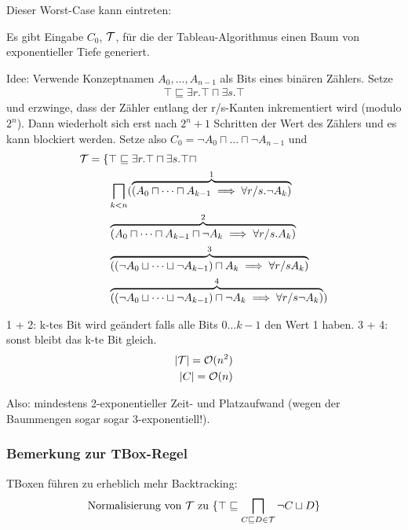 Dieser Worst-Case kann eintreten:

\begin{lemma}
Es gibt Eingabe $C_0$, $\mathcal{T}$, für die der Tableau-Algorithmus einen Baum von exponentieller Tiefe generiert.
\end{lemma}

Idee: Verwende Konzeptnamen $A_0,\ldots, A_{n - 1}$ als Bits eines binären Zählers. Setze
\begin{align*}
    \top \sqsubseteq \exists r. \top \sqcap \exists s.\top
\end{align*}
und erzwinge, dass der Zähler entlang der r/s-Kanten inkrementiert wird (modulo $2^n$). Dann wiederholt sich erst nach $2^n + 1$ Schritten der Wert des Zählers und es kann blockiert werden.
Setze also $C_0 = \neg A_0 \sqcap \dots \sqcap \neg A_{n - 1}$ und
\begin{align*}
    \mathcal{T} = \{&\top \sqsubseteq \exists r.\top \sqcap \exists s.\top \sqcap\\
            &\bigsqcap_{k<n} (\overbrace{(A_0 \sqcap \dots \sqcap A_{k - 1} \implies \forall r/s.\neg A_k)}^1\\
            & \overbrace{(A_0\sqcap \dots \sqcap A_{k - 1} \sqcap \neg A_k \implies \forall r/s. A_k)}^2\\
            & \overbrace{((\neg A_0 \sqcup \dots \sqcup \neg A_{k - 1}) \sqcap A_k \implies \forall r/s A_k)}^3\\
            & \overbrace{((\neg A_0 \sqcup \dots \sqcup \neg A_{k - 1}) \sqcap \neg A_k \implies \forall r/s \neg A_k)}^4)
\end{align*}

1 + 2: k-tes Bit wird geändert falls alle Bits $0 \ldots k-1$ den Wert 1 haben. 3 + 4: sonst bleibt das k-te Bit gleich.
\begin{align*}
    \left| \MT \right| = \mathcal{O}(n^2)\\
    \left| C \right| = \mathcal{O}(n)
\end{align*}


Also: mindestens 2-exponentieller Zeit- und Platzaufwand (wegen der Baummengen sogar sogar 3-exponentiell!).

\subsubsection{Bemerkung zur TBox-Regel}

TBoxen führen zu erheblich mehr Backtracking:
\begin{align*}
    \text{Normalisierung von }\mathcal{T}\text{ zu }\{\top \sqsubseteq \bigsqcap_{C \sqsubseteq D \in \mathcal{T}} \neg C \sqcup D\}
\end{align*}


